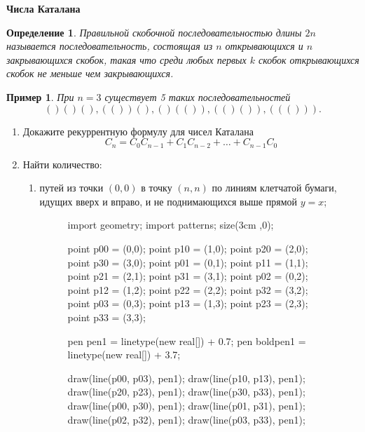 \documentclass{article}
\newtheorem{definition}{Определение}
\newtheorem{example}{Пример}
\begin{document}
\large
	\begin{center}
		\textbf{Числа Каталана}
	\end{center}
	
	\begin{definition}
		Правильной скобочной последовательностью длины $2n$ называется
		последовательность, состоящая из $n$ открывающихся и $n$ закрывающихся скобок,
		такая что среди любых первых $k$ скобок открывающихся скобок не меньше чем
		закрывающихся.
	\end{definition}
	
	\begin{example}
		При $n = 3$ существует 5 таких последовательностей $$()()(), (())(), ()(()), (()()), ((())).$$
	\end{example}
	
	\begin{enumerate}[label*=\protect\fbox{\arabic{enumi}}]
		\item Докажите рекуррентную формулу для чисел Каталана
		$$C_n = C_0C_{n-1} + C_1C_{n-2} + \dotsc + C_{n-1}C_0$$
		
		\item Найти количество:
		\begin{enumerate}
			\item путей из точки $(0, 0)$ в точку $(n, n)$ по линиям клетчатой бумаги, идущих вверх и вправо, и не поднимающихся выше прямой $y = x$;
			
			
			\begin{figure}[h]
				\centering
				\begin{minipage}{0.18\textwidth}
					\centering
					\begin{asy}
					import geometry;
					import patterns;
					size(3cm ,0);
					
					point p00 = (0,0);
					point p10 = (1,0);
					point p20 = (2,0);
					point p30 = (3,0);
					point p01 = (0,1);
					point p11 = (1,1);
					point p21 = (2,1);
					point p31 = (3,1);
					point p02 = (0,2);
					point p12 = (1,2);
					point p22 = (2,2);
					point p32 = (3,2);
					point p03 = (0,3);
					point p13 = (1,3);
					point p23 = (2,3);
					point p33 = (3,3);
					
					
					pen pen1 = linetype(new real[]) + 0.7;
					pen boldpen1 = linetype(new real[]) + 3.7;
					
					
					draw(line(p00, p03), pen1);
					draw(line(p10, p13), pen1);
					draw(line(p20, p23), pen1);
					draw(line(p30, p33), pen1);
					draw(line(p00, p30), pen1);
					draw(line(p01, p31), pen1);
					draw(line(p02, p32), pen1);
					draw(line(p03, p33), pen1);
					

\end{asy}
\end{minipage}
\end{figure}
\end{enumerate}
\end{enumerate}
\end{document}
